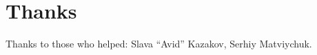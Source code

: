 ﻿\documentclass{book}
\author{\AUTHOR}
\title{\TITLE}
\date{August-2015 --- August 2016}
\begin{document}
\maketitle

\tableofcontents

\section*{Thanks}

Thanks to those who helped: Slava ``Avid'' Kazakov, Serhiy Matviychuk.

\mainmatter


\end{document}
